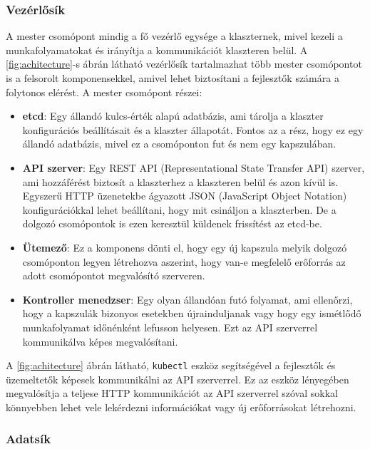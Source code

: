 \subsubsection{Vezérlősík}

A mester csomópont mindig a fő vezérlő egysége a klaszternek, mivel kezeli a 
munkafolyamatokat és irányítja a kommunikációt klaszteren belül. A 
\ref{fig:achitecture}-s ábrán látható vezérlősík tartalmazhat több mester csomópontot is 
a felsorolt komponensekkel, amivel lehet biztosítani a fejlesztők számára a folytonos 
elérést. A mester csomópont részei: 

\begin{itemize}
	\item \textbf{etcd}: Egy állandó kulcs-érték alapú adatbázis, ami tárolja 
	a klaszter konfigurációs beállításait és a klaszter állapotát. Fontos az a rész, 
	hogy ez egy állandó adatbázis, mivel ez a csomóponton fut és nem egy 
	kapszulában.   
	\item \textbf{API szerver}: Egy REST API (Representational State Transfer API) 
	szerver, ami hozzáférést biztosít a klaszterhez a klaszteren belül és azon kívül is. 
	Egyszerű HTTP üzenetekbe ágyazott JSON (JavaScript Object Notation) konfigurációkkal
	lehet beállítani, hogy mit csináljon a klaszterben. De a dolgozó csomópontok is ezen 
	keresztül küldenek frissítést az etcd-be. 
	\item \textbf{Ütemező}: Ez a komponens dönti el, hogy egy új kapszula melyik
	dolgozó csomóponton legyen létrehozva aszerint, hogy van-e megfelelő erőforrás
	az adott csomópontot megvalósító szerveren.
	\item \textbf{Kontroller menedzser}: Egy olyan állandóan futó folyamat, ami ellenőrzi,
	hogy a kapszulák bizonyos esetekben újrainduljanak vagy hogy egy ismétlődő 
	munkafolyamat időnénként lefusson helyesen. Ezt az API szerverrel kommunikálva
	képes megvalósítani. 
\end{itemize}

A \ref{fig:achitecture} ábrán látható, \texttt{kubectl} eszköz segítségével a fejlesztők 
és üzemeltetők képesek kommunikálni az API szerverrel. Ez az eszköz lényegében
megvalósítja a teljese HTTP kommunikációt az API szerverrel szóval sokkal könnyebben 
lehet vele lekérdezni információkat vagy új erőforrásokat létrehozni. 

\subsubsection{Adatsík}

